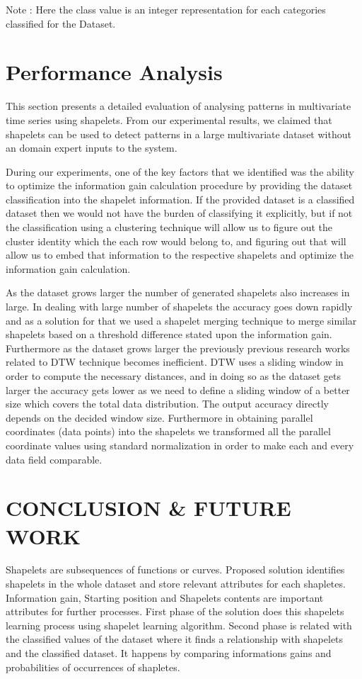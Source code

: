 \documentclass[letterpaper, 10 pt, conference]{IEEEtran}  %
\begin{document}
Note : Here the class value is an integer representation for each categories classified for the Dataset.

\section{Performance Analysis}
This section presents a detailed evaluation of analysing patterns in multivariate time series using shapelets. From our experimental results, we claimed that shapelets can be used to detect patterns in a large multivariate dataset without an domain expert inputs to the system.

During our experiments, one of the key factors that we identified was the ability to optimize the information gain calculation procedure by providing the dataset classification into the shapelet information. If the provided dataset is a classified dataset then we would not have the burden of classifying it explicitly, but if not the classification using a clustering technique will allow us to figure out the cluster identity which the each row would belong to, and figuring out that will allow us to embed that information to the respective shapelets and optimize the information gain calculation.
 
As the dataset grows larger the number of generated shapelets also increases in large. In dealing with large number of shapelets the accuracy goes down rapidly and as a solution for that we used a shapelet merging technique to merge similar shapelets based on a threshold difference stated upon the information gain. Furthermore as the dataset grows larger the previously previous research works related to DTW technique becomes inefficient. DTW uses a sliding window in order to compute the necessary distances, and in doing so as the dataset gets larger the accuracy gets lower as we need to define a sliding window of a better size which covers the total data distribution. The output accuracy directly depends on the decided window size.
Furthermore in obtaining parallel coordinates (data points) into the shapelets we transformed all the parallel coordinate values using standard normalization in order to make each and every data field comparable.


\section{CONCLUSION \& FUTURE WORK}

Shapelets are subsequences of functions or curves. Proposed solution identifies shapelets in the whole dataset and store relevant attributes for each shapletes. Information gain, Starting position and Shapelets contents are important attributes for further processes. First phase of the solution does this shapelets learning process using shapelet learning algorithm. Second phase is related with the classified values of the dataset where it finds a relationship with shapelets and the classified dataset. It happens by comparing informations gains and probabilities of occurrences of shapletes.  
\end{document}
